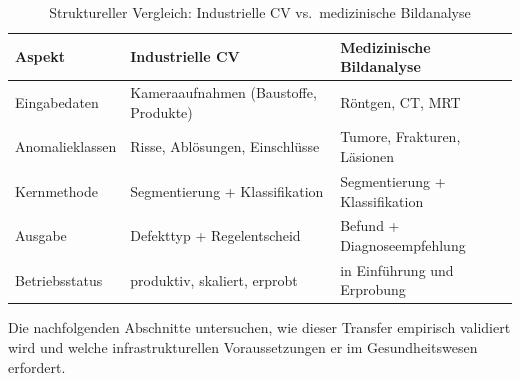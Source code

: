 \begin{table}[htbp]
    \centering
    \caption{Struktureller Vergleich: Industrielle CV vs.\ medizinische Bildanalyse}
    \label{tab:vergleich}
    \begin{tabularx}{\textwidth}{|l|X|X|}
        \hline
        \textbf{Aspekt} & \textbf{Industrielle CV} & \textbf{Medizinische Bildanalyse} \\
        \hline
        Eingabedaten    & Kameraaufnahmen (Baustoffe, Produkte) & Röntgen, CT, MRT \\
        Anomalieklassen & Risse, Ablösungen, Einschlüsse        & Tumore, Frakturen, Läsionen \\
        Kernmethode     & Segmentierung + Klassifikation         & Segmentierung + Klassifikation \\
        Ausgabe         & Defekttyp + Regelentscheid             & Befund + Diagnoseempfehlung \\
        Betriebsstatus  & produktiv, skaliert, erprobt           & in Einführung und Erprobung \\
        \hline
    \end{tabularx}
\end{table}

Die nachfolgenden Abschnitte untersuchen, wie dieser Transfer empirisch validiert wird
und welche infrastrukturellen Voraussetzungen er im Gesundheitswesen erfordert.
